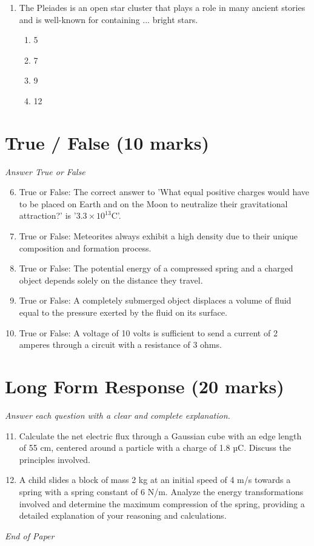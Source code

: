 \documentclass[12pt]{article}
\begin{document}
\begin{enumerate}[label=\arabic*.]
\begin{enumerate}[label=(\alph*)]
    \item 5.5
    \item 1.8
    \item 4.2
\end{enumerate}
\item The Pleiades is an open star cluster that plays a role in many ancient stories and is well-known for containing ... bright stars.
\begin{enumerate}[label=(\alph*)]
    \item 5
    \item 7
    \item 9
    \item 12
\end{enumerate}
\end{enumerate}

\section*{True / False (10 marks)}
\textit{Answer True or False}
\begin{enumerate}[label=\arabic*.]
\setcounter{enumi}{5}
\item True or False: The correct answer to 'What equal positive charges would have to be placed on Earth and on the Moon to neutralize their gravitational attraction?' is '$3.3 \times 10^{13} \mathrm{C}$'.
\item True or False: Meteorites always exhibit a high density due to their unique composition and formation process.
\item True or False: The potential energy of a compressed spring and a charged object depends solely on the distance they travel.
\item True or False: A completely submerged object displaces a volume of fluid equal to the pressure exerted by the fluid on its surface.
\item True or False: A voltage of 10 volts is sufficient to send a current of 2 amperes through a circuit with a resistance of 3 ohms.
\end{enumerate}

\section*{Long Form Response (20 marks)}
\textit{Answer each question with a clear and complete explanation.}
\begin{enumerate}[label=\arabic*.]
\setcounter{enumi}{10}
\item Calculate the net electric flux through a Gaussian cube with an edge length of 55 cm, centered around a particle with a charge of 1.8 µC. Discuss the principles involved.
\item A child slides a block of mass 2 kg at an initial speed of 4 m/s towards a spring with a spring constant of 6 N/m. Analyze the energy transformations involved and determine the maximum compression of the spring, providing a detailed explanation of your reasoning and calculations.
\end{enumerate}

\vfill
\noindent\textit{End of Paper}
\end{document}
